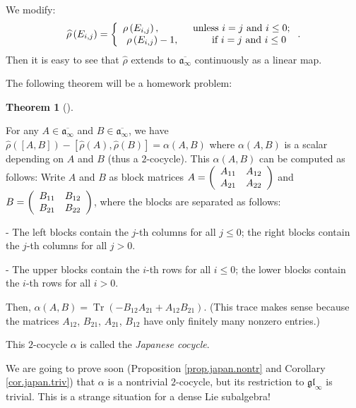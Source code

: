 \documentclass
[numbers=enddot,12pt,final,onecolumn,german,notitlepage]{scrartcl}%
\theoremstyle{definition}
\newtheorem{theo}{Theorem}
\newenvironment{theorem}[1][]
{\begin{theo}[#1]\begin{leftbar}}
{\end{leftbar}\end{theo}}
\begin{document}
We modify:%
\[
\widehat{\rho}\left(  E_{i,j}\right)  =\left\{
\begin{array}
[c]{c}%
\rho\left(  E_{i,j}\right)  ,\ \ \ \ \ \ \ \ \ \ \text{unless }i=j\text{ and
}i\leq0;\\
\rho\left(  E_{i,j}\right)  -1,\ \ \ \ \ \ \ \ \ \ \text{if }i=j\text{ and
}i\leq0
\end{array}
\right.  .
\]
Then it is easy to see that $\widehat{\rho}$ extends to $\overline
{\mathfrak{a}_{\infty}}$ continuously as a linear map.

The following theorem will be a homework problem:

\begin{theorem}
\label{thm.japan}For any $A\in\overline{\mathfrak{a}_{\infty}}$ and
$B\in\overline{\mathfrak{a}_{\infty}}$, we have $\widehat{\rho}\left(  \left[
A,B\right]  \right)  -\left[  \widehat{\rho}\left(  A\right)  ,\widehat{\rho
}\left(  B\right)  \right]  =\alpha\left(  A,B\right)  $ where $\alpha\left(
A,B\right)  $ is a scalar depending on $A$ and $B$ (thus a $2$-cocycle). This
$\alpha\left(  A,B\right)  $ can be computed as follows: Write $A$ and $B$ as
block matrices $A=\left(
\begin{array}
[c]{cc}%
A_{11} & A_{12}\\
A_{21} & A_{22}%
\end{array}
\right)  $ and $B=\left(
\begin{array}
[c]{cc}%
B_{11} & B_{12}\\
B_{21} & B_{22}%
\end{array}
\right)  $, where the blocks are separated as follows:

- The left blocks contain the $j$-th columns for all $j\leq0$; the right
blocks contain the $j$-th columns for all $j>0$.

- The upper blocks contain the $i$-th rows for all $i\leq0$; the lower blocks
contain the $i$-th rows for all $i>0$.

Then, $\alpha\left(  A,B\right)  =\operatorname*{Tr}\left(  -B_{12}%
A_{21}+A_{12}B_{21}\right)  $. (This trace makes sense because the matrices
$A_{12}$, $B_{21}$, $A_{21}$, $B_{12}$ have only finitely many nonzero entries.)
\end{theorem}

This $2$-cocycle $\alpha$ is called the \textit{Japanese cocycle}.

We are going to prove soon (Proposition \ref{prop.japan.nontr} and Corollary
\ref{cor.japan.triv}) that $\alpha$ is a nontrivial $2$-cocycle, but its
restriction to $\mathfrak{gl}_{\infty}$ is trivial. This is a strange
situation for a dense Lie subalgebra!
\end{document}
